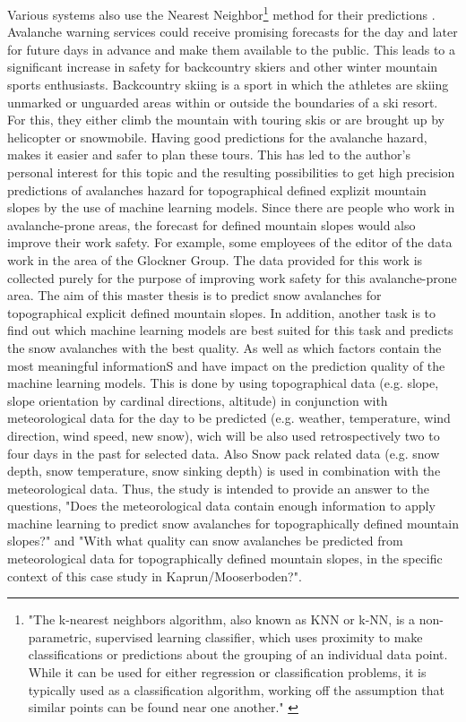 \documentclass[../masterarbeit.tex]{subfiles}
\begin{document}
Various systems also use the Nearest Neighbor\footnote{"The k-nearest neighbors algorithm, also known as KNN or k-NN, is a non-parametric, supervised learning classifier, which uses proximity to make classifications or predictions about the grouping of an individual data point. While it can be used for either regression or classification problems, it is typically used as a classification algorithm, working off the assumption that similar points can be found near one another." \autocite[]{ibm-Nearest-Neighbors:2022} } method for their predictions \textcite[]{Pozdnoukhov:2008}.
Avalanche warning services could receive promising forecasts for the day and later for future days in advance and make them available to the public. This leads to a significant increase in safety for backcountry skiers and other winter mountain sports enthusiasts.
Backcountry skiing is a sport in which the athletes are skiing unmarked or unguarded areas within or outside the boundaries of a ski resort. For this, they either climb the mountain with touring skis or are brought up by helicopter or snowmobile. Having good predictions for the avalanche hazard, makes it easier and safer to plan these tours. This has led to the author's personal interest for this topic and the resulting possibilities to get high precision predictions of avalanches hazard for topographical defined explizit mountain slopes by the use of machine learning models.
Since there are people who work in avalanche-prone areas, the forecast for defined mountain slopes would also improve their work safety.  For example, some employees of the editor of the data work in the area of the Glockner Group. The data provided for this work is collected purely for the purpose of improving work safety for this avalanche-prone area.
\newline
\newline
The aim of this master thesis is to predict snow avalanches for topographical explicit defined mountain slopes. In addition, another task is to find out which machine learning models are best suited for this task and predicts the snow avalanches with the best quality. As well as which factors contain the most meaningful informationS and have impact on the prediction quality of the machine learning models.  This is done by using topographical data (e.g. slope, slope orientation by cardinal directions, altitude) in conjunction with meteorological data for the day to be predicted (e.g. weather, temperature, wind direction, wind speed, new snow), wich will be also used retrospectively two to four days in the past for selected data. Also Snow pack related data (e.g. snow depth, snow temperature, snow sinking depth) is used in combination with the meteorological data. Thus, the study is intended to provide an answer to the questions, "Does the meteorological data contain enough information to apply machine learning to predict snow avalanches for topographically defined mountain slopes?" and "With what quality can snow avalanches be predicted from meteorological data for topographically defined mountain slopes, in the specific context of this case study in Kaprun/Mooserboden?". 
\end{document}
